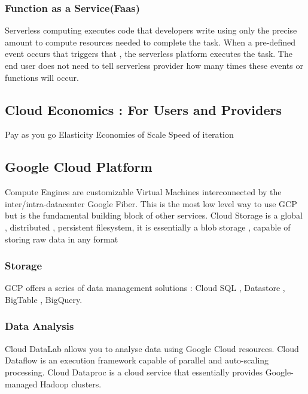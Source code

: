 \documentclass{article}
\begin{document}
\subsubsection{Function as a Service(Faas)}
Serverless computing executes code that developers write using only the precise amount to compute resources needed to complete the task.
When a pre-defined event occurs that triggers that , the serverless platform executes the task. The end user does not need to tell serverless provider how many times these events or functions will occur.

\subsection{Cloud Economics : For Users and Providers}
Pay as you go 
Elasticity 
Economies of Scale 
Speed of iteration 

\subsection{Google Cloud Platform}

Compute Engines are customizable Virtual Machines interconnected by the inter/intra-datacenter Google Fiber. This is the most low level way to use GCP but is the fundamental building block of other services. 
Cloud Storage is a global , distributed , persistent filesystem, it is essentially a blob storage , capable of storing raw data in any format

\subsubsection{Storage}
GCP offers a series of data management solutions : Cloud SQL , Datastore , BigTable , BigQuery.

\subsubsection{Data Analysis}
Cloud DataLab allows you to analyse data using Google Cloud resources.
Cloud Dataflow is an execution framework capable of parallel and auto-scaling processing.
Cloud Dataproc is a cloud service that essentially provides Google-managed Hadoop clusters.
\end{document}
